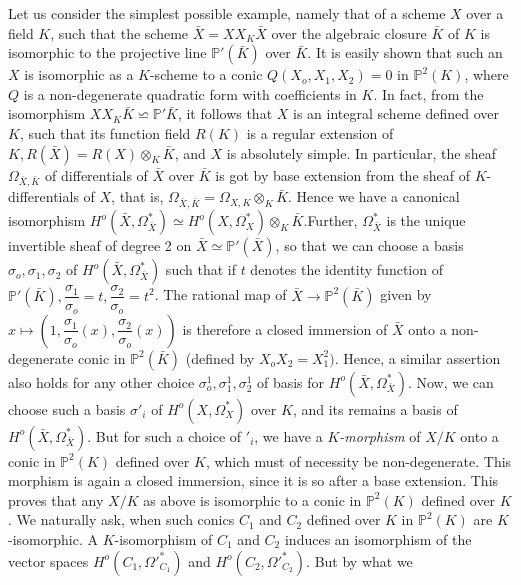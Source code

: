 Let us consider the simplest possible example, namely that of a scheme
$X$ over a field $K$, such that the scheme $\bar{X} = X X_K \bar{X}$
over the algebraic closure $\bar{K}$ of $K$ is isomorphic to the
projective line $\mathbb{P}'(\bar{K})$ over $\bar{K}$. It is easily
shown that such an $X$ is isomorphic as a $K$-scheme to a conic
$Q(X_o, X_1, X_2)=0$ in $\mathbb{P}^2 (K)$, where $Q$ is a
non-degenerate quadratic form with coefficients in $K$. In fact, from
the isomorphism $X X_K \bar{K} \backsimeq \mathbb{P}' \bar{K}$, it
follows that $X$ is an integral scheme defined over $K$, such that its
function field $R(K)$ is a regular extension of $K, R(\bar{X}) =  R(X)
\otimes_K \bar{K}$, and $X$ is absolutely simple. In particular, the
sheaf $\Omega_{\bar{X}, \bar{K}}$ of differentials of $\bar{X}$ over
$\bar{K}$ is got by base extension from the sheaf of $K$-differentials
of $X$, that is, $\Omega_{\bar{X}, \bar{K}} = \Omega_{X, K} \otimes_K
\bar{K}$. Hence we have a canonical isomorphism $H^o (\bar{X},
\Omega^{*}_{\bar{X}}) \simeq H^o (X, \Omega^{*}_{X}) \otimes_K
\bar{K}$.\pageoriginale Further, $\Omega^{*}_{\bar{X}}$ is the unique invertible
sheaf of degree 2 on $\bar {X} \simeq \mathbb{P}'(\bar{X})$, so that
we can choose a basis $\sigma_o, \sigma_1, \sigma_2$ of $H^o (\bar{X},
\Omega^{*}_{\bar{X}})$ such that if $t$ denotes the identity function
of $\mathbb{P}'(\bar{K}), \dfrac{\sigma_1}{\sigma_o} = t,
\dfrac{\sigma_2}{\sigma_o}=t^2$. The rational map of $\bar{X} \to
\mathbb{P}^2(\bar{K})$ given by $x \mapsto (1,
\dfrac{\sigma_1}{\sigma_o}(x), \dfrac{\sigma_2}{\sigma_o}(x))$ is
therefore a closed immersion of $\bar{X}$ onto a non-degenerate conic
in $\mathbb{P}^2(\bar{K})$ (defined by $X_o X_2 = X^2_1)$. Hence, a
similar assertion also holds for any other choice
$\sigma^{1}_{o},\sigma^{1}_{1},\sigma^{1}_{2}$ of basis for $H^o
(\bar{X}, \Omega^*_{\bar{X}})$. Now, we can choose such a basis
$\sigma'_{i}$ of $H^o (X, \Omega^*_{X})$ over $K$, and its remains
a basis of $H^o (\bar{X}, \Omega^*_{\bar{X}})$. But for such a choice
of $'_{i}$, we have a \textit{$K$-morphism } of $X/K$ onto a conic
in $\mathbb{P}^2(K)$ defined over $K$, which must of necessity be
non-degenerate. This morphism is again a closed immersion, since it is
so after a base extension. This proves that any $X/K$ as above is
isomorphic to a conic in $\mathbb{P}^2(K)$ defined over $K$. We
naturally ask, when such conics $C_1$ and $C_2$ defined over $K$ in
$\mathbb{P}^2(K)$ are $K$-isomorphic. A $K$-isomorphism of $C_1$ and
$C_2$ induces an isomorphism of the vector spaces $H^o (C_1,
\Omega'^*_{C_1})$ and $H^o (C_2, \Omega'^*_{C_2})$. But by what we
